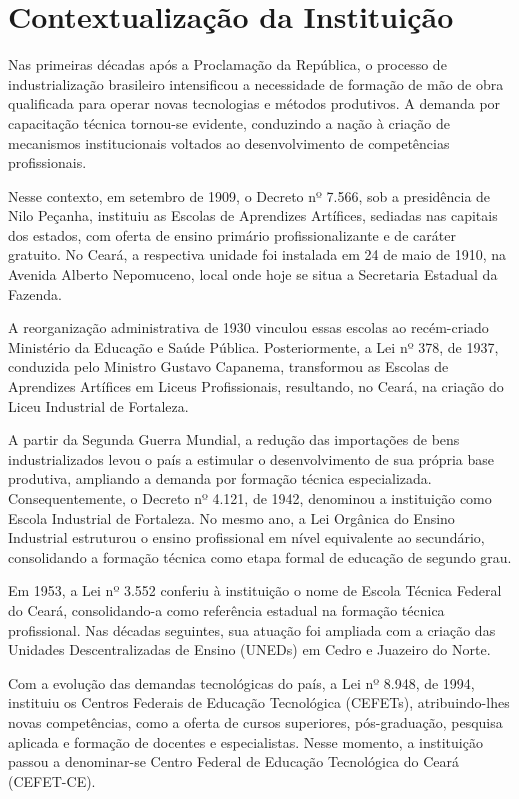 

\section{Contextualização da Instituição}
 
Nas primeiras décadas após a Proclamação da República, o processo de industrialização brasileiro intensificou a necessidade de formação de mão de obra qualificada para operar novas tecnologias e métodos produtivos. A demanda por capacitação técnica tornou-se evidente, conduzindo a nação à criação de mecanismos institucionais voltados ao desenvolvimento de competências profissionais.

Nesse contexto, em setembro de 1909, o Decreto nº 7.566, sob a presidência de Nilo Peçanha, instituiu as Escolas de Aprendizes Artífices, sediadas nas capitais dos estados, com oferta de ensino primário profissionalizante e de caráter gratuito. No Ceará, a respectiva unidade foi instalada em 24 de maio de 1910, na Avenida Alberto Nepomuceno, local onde hoje se situa a Secretaria Estadual da Fazenda.

A reorganização administrativa de 1930 vinculou essas escolas ao recém-criado Ministério da Educação e Saúde Pública. Posteriormente, a Lei nº 378, de 1937, conduzida pelo Ministro Gustavo Capanema, transformou as Escolas de Aprendizes Artífices em Liceus Profissionais, resultando, no Ceará, na criação do Liceu Industrial de Fortaleza.

A partir da Segunda Guerra Mundial, a redução das importações de bens industrializados levou o país a estimular o desenvolvimento de sua própria base produtiva, ampliando a demanda por formação técnica especializada. Consequentemente, o Decreto nº 4.121, de 1942, denominou a instituição como Escola Industrial de Fortaleza. No mesmo ano, a Lei Orgânica do Ensino Industrial estruturou o ensino profissional em nível equivalente ao secundário, consolidando a formação técnica como etapa formal de educação de segundo grau.

Em 1953, a Lei nº 3.552 conferiu à instituição o nome de Escola Técnica Federal do Ceará, consolidando-a como referência estadual na formação técnica profissional. Nas décadas seguintes, sua atuação foi ampliada com a criação das Unidades Descentralizadas de Ensino (UNEDs) em Cedro e Juazeiro do Norte.

Com a evolução das demandas tecnológicas do país, a Lei nº 8.948, de 1994, instituiu os Centros Federais de Educação Tecnológica (CEFETs), atribuindo-lhes novas competências, como a oferta de cursos superiores, pós-graduação, pesquisa aplicada e formação de docentes e especialistas. Nesse momento, a instituição passou a denominar-se Centro Federal de Educação Tecnológica do Ceará (CEFET-CE).

